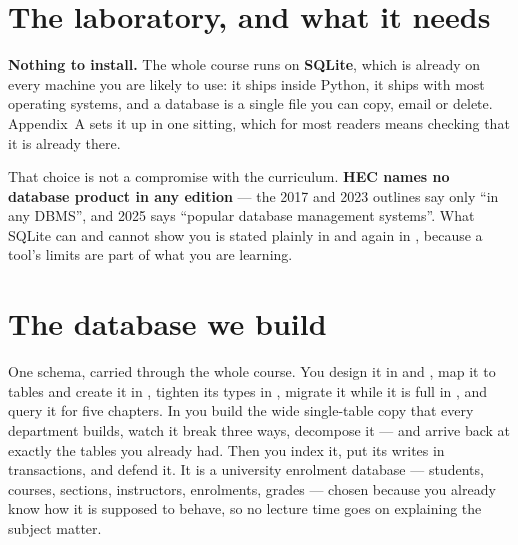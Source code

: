 \section*{The laboratory, and what it needs}

\textbf{Nothing to install.} The whole course runs on \textbf{SQLite}, which
is already on every machine you are likely to use: it ships inside Python, it
ships with most operating systems, and a database is a single file you can
copy, email or delete. Appendix~A sets it up in one sitting, which for most
readers means checking that it is already there.

That choice is not a compromise with the curriculum. \textbf{HEC names no
database product in any edition} --- the 2017 and 2023 outlines say only
``in any DBMS'', and 2025 says ``popular database management systems''. What
SQLite can and cannot show you is stated plainly in  and
again in , because a tool's limits are part of what you are
learning.

\section*{The database we build}

One schema, carried through the whole course. You design it in
 and , map it to tables and create it in
, tighten its types in , migrate it while it is full
in , and query it for five chapters. In 
you build the wide single-table copy that every department builds, watch it
break three ways, decompose it --- and arrive back at exactly the tables you
already had. Then you index it, put its writes in transactions, and defend it.
It is a university enrolment database --- students, courses, sections,
instructors, enrolments, grades --- chosen because you already know how it is
supposed to behave, so no lecture time goes on explaining the subject matter.


